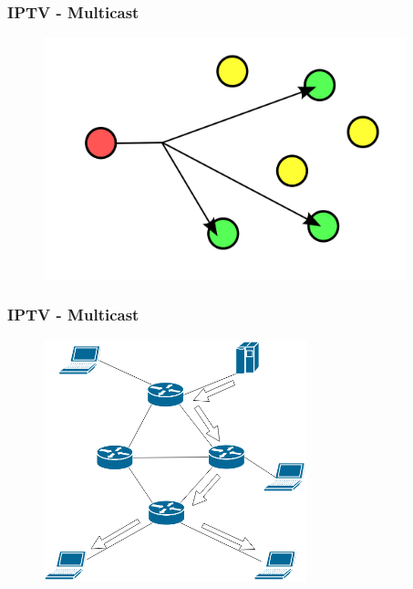 \documentclass[a4paper,11pt]{beamer}
\begin{document}

\begin{frame}
\frametitle{IPTV - Multicast}
\begin{figure}
 \includegraphics[height=7cm]{multicast.png}
\end{figure}
\end{frame}



\begin{frame}
\frametitle{IPTV - Multicast}
\begin{figure}
 \includegraphics[height=7cm]{topoloy.png}
\end{figure}
\end{frame}

\end{document}
